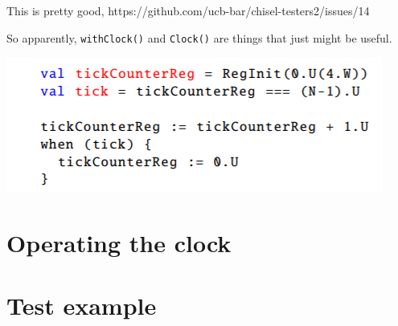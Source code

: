 \documentclass[b5paper]{article}
\begin{document}
This is pretty good, https://github.com/ucb-bar/chisel-testers2/issues/14

So apparently, \texttt{withClock()} and \texttt{Clock()} are things that just might be useful. 

\includegraphics{Tickcount.PNG}

\section{Operating the clock}


\section{Test example}
\end{document}
